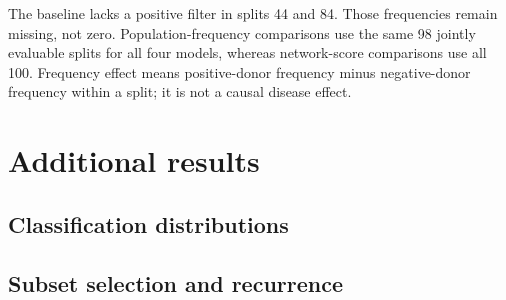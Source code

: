 \documentclass[11pt,a4paper]{article}
\begin{document}
The baseline lacks a positive filter in splits 44 and 84. Those frequencies remain missing, not zero. Population-frequency comparisons use the same 98 jointly evaluable splits for all four models, whereas network-score comparisons use all 100. Frequency effect means positive-donor frequency minus negative-donor frequency within a split; it is not a causal disease effect.

\section{Additional results}
\subsection{Classification distributions}
\begin{table}[htb]\centering\small

\caption{Three-method benchmark on the 30 common splits: median [Q1, Q3]. AUC and AP are score-based; BA uses the method's declared decision threshold.}
\end{table}
\begin{table}[htb]\centering\small

\caption{Means over the same 30 splits. Means and medians are deliberately reported separately.}
\end{table}
\begin{table}[htb]\centering\small

\caption{Additional CellCNN/SVM comparison over all 100 stored splits: median [Q1, Q3]. This is a separate comparison, not an extension of Citrus to 100 splits.}
\end{table}
\begin{table}[htb]\centering\footnotesize

\caption{Paired AUC differences on identical donor splits. Better/equal/worse counts describe the first method relative to the second. No independence-based significance test is inferred from these overlapping repeats.}
\end{table}

\subsection{Subset selection and recurrence}
\begin{table}[htb]\centering\small

\caption{Selection on the fixed 10,000-cell map and profile availability over 180 full-test-donor visits per method. The denominator for a cell is all test visits of its own donor, not 30.}
\end{table}
\begin{table}[htb]\centering\small

\caption{Recurring training-subset groups from the original centroid analysis. Splits count unique occurrences; positive and negative counts may overlap within a group.}
\end{table}
\end{document}
